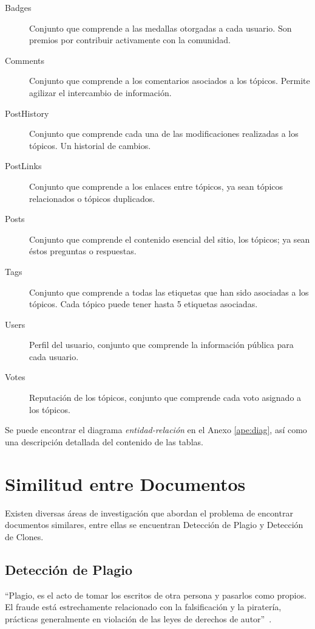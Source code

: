 \begin{description}
  \item [Badges] Conjunto que comprende a las medallas otorgadas a cada usuario.
  Son premios por contribuir activamente con la comunidad.
  \item [Comments] Conjunto que comprende a los comentarios asociados a los tópicos.
  Permite agilizar el intercambio de información.
  \item [PostHistory] Conjunto que comprende cada una de las modificaciones realizadas a los tópicos.
  Un historial de cambios.
  \item [PostLinks] Conjunto que comprende a los enlaces entre tópicos,
  ya sean tópicos relacionados o tópicos duplicados.
  \item [Posts] Conjunto que comprende el contenido esencial del sitio, los tópicos;
  ya sean éstos preguntas o respuestas.
  \item [Tags] Conjunto que comprende a todas las etiquetas que han sido asociadas a los tópicos.
  Cada tópico puede tener hasta 5 etiquetas asociadas.
  \item [Users] Perfil del usuario, conjunto que comprende la información pública para cada usuario.
  \item [Votes] Reputación de los tópicos, conjunto que comprende cada voto asignado a los tópicos.
\end{description}

Se puede encontrar el diagrama \textit{entidad-relación} en el Anexo \ref{ape:diag},
así como una descripción detallada del contenido de las tablas.

\section{Similitud entre Documentos}
\label{sec:sim}

Existen diversas áreas de investigación que abordan el problema de encontrar
documentos similares, entre ellas se encuentran Detección de Plagio
y Detección de Clones.

\subsection{Detección de Plagio}
\label{subsec:plagio}

“Plagio, es el acto de tomar los escritos de otra persona y pasarlos como propios.
El fraude está estrechamente relacionado con la falsificación y la piratería,
prácticas generalmente en violación de las leyes de derechos de autor”~\cite{britannica_2017}.

